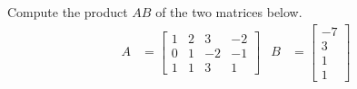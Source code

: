 Compute the product $AB$ of the two matrices below.
%
\begin{align*}
A&=
\begin{bmatrix}
1 & 2 & 3 & -2 \\ 0 & 1 & -2 & -1\\ 1 & 1 & 3 & 1
\end{bmatrix}
&
B&=
\begin{bmatrix}
-7\\ 3 \\ 1 \\ 1
\end{bmatrix}
\end{align*}
